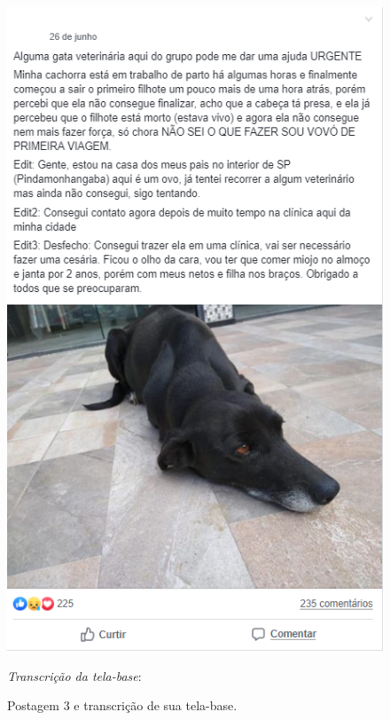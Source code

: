 \documentclass{textolivre}
\begin{document}
\begin{figure}[htbp]
 \begin{minipage}{.45\textwidth}
 \centering
 \includegraphics[width=\textwidth]{fig05.png}
 \caption{Postagem 3 e transcrição de sua tela-base.}
 \label{fig05}
 \end{minipage}\hfill
 \begin{minipage}{0.5\textwidth}
 \textit{Transcrição da tela-base}:\\
 

\end{minipage}
\end{figure}
\end{document}
